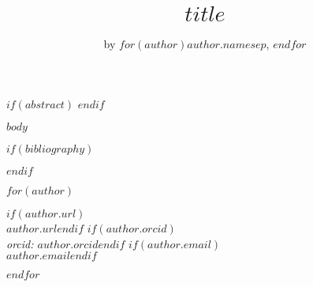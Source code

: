 \title{$title$}
\author{by $for(author)$$author.name$$sep$, $endfor$}

\maketitle

$if(abstract)$
$endif$

$body$

$if(bibliography)$

$endif$

$for(author)$
\address{%
$author.name$
$for(author.affiliation/pairs)$
  $if(it.value)$
    $for(it.value.name)$\\$it.value.name$$endfor$%
    $for(it.value.address)$$it.value.address$$sep$ \\$endfor$\\%
  $else$
   \\$author.affiliation$\\
  $endif$
$endfor$
$for(author.address)$$author.address$$sep$ \\$endfor$%
}
$if(author.url)$\\$author.url$$endif$%
$if(author.orcid)$\\\textit{orcid: \href{https://orcid.org/$author.orcid$}{$author.orcid$}}$endif$%
$if(author.email)$\\$author.email$$endif$

$endfor$
